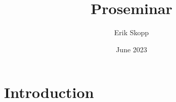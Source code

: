 \documentclass{article}
\title{Proseminar}
\author{Erik Skopp}
\date{June 2023}
\begin{document}
\maketitle

\section{Introduction}
\end{document}
